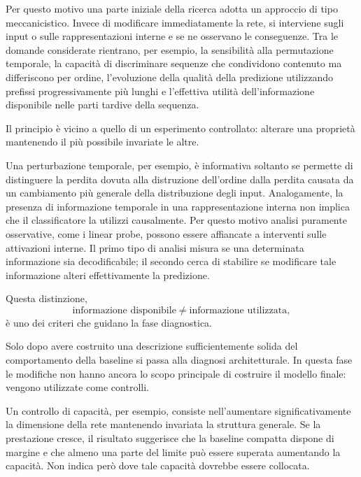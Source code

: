 Per questo motivo una parte iniziale della ricerca adotta un approccio di tipo meccanicistico. Invece di modificare immediatamente la rete, si interviene sugli input o sulle rappresentazioni interne e se ne osservano le conseguenze. Tra le domande considerate rientrano, per esempio, la sensibilità alla permutazione temporale, la capacità di discriminare sequenze che condividono contenuto ma differiscono per ordine, l'evoluzione della qualità della predizione utilizzando prefissi progressivamente più lunghi e l'effettiva utilità dell'informazione disponibile nelle parti tardive della sequenza.

Il principio è vicino a quello di un esperimento controllato: alterare una proprietà mantenendo il più possibile invariate le altre.

Una perturbazione temporale, per esempio, è informativa soltanto se permette di distinguere la perdita dovuta alla distruzione dell'ordine dalla perdita causata da un cambiamento più generale della distribuzione degli input. Analogamente, la presenza di informazione temporale in una rappresentazione interna non implica che il classificatore la utilizzi causalmente. Per questo motivo analisi puramente osservative, come i linear probe, possono essere affiancate a interventi sulle attivazioni interne. Il primo tipo di analisi misura se una determinata informazione sia decodificabile; il secondo cerca di stabilire se modificare tale informazione alteri effettivamente la predizione.

Questa distinzione,
\begin{equation}
\label{eq:info_disponibile_vs_utilizzata}
\text{informazione disponibile} \neq \text{informazione utilizzata},
\end{equation}
è uno dei criteri che guidano la fase diagnostica.

Solo dopo avere costruito una descrizione sufficientemente solida del comportamento della baseline si passa alla diagnosi architetturale. In questa fase le modifiche non hanno ancora lo scopo principale di costruire il modello finale: vengono utilizzate come controlli.

Un controllo di capacità, per esempio, consiste nell'aumentare significativamente la dimensione della rete mantenendo invariata la struttura generale. Se la prestazione cresce, il risultato suggerisce che la baseline compatta dispone di margine e che almeno una parte del limite può essere superata aumentando la capacità. Non indica però dove tale capacità dovrebbe essere collocata.

